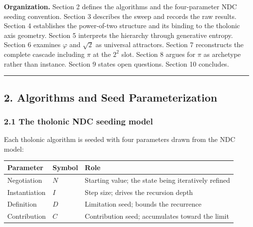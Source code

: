\documentclass[
  11pt,
  letterpaper,
]{article}
\begin{document}
\textbf{Organization.} Section 2 defines the algorithms and the
four-parameter NDC seeding convention. Section 3 describes the sweep and
records the raw results. Section 4 establishes the power-of-two
structure and its binding to the tholonic axis geometry. Section 5
interprets the hierarchy through generative entropy. Section 6 examines
\(\varphi\) and \(\sqrt{2}\) as universal attractors. Section 7
reconstructs the complete cascade including \(\pi\) at the \(2^2\) slot.
Section 8 argues for \(\pi\) as archetype rather than instance. Section
9 states open questions. Section 10 concludes.

\begin{center}\rule{0.5\linewidth}{0.5pt}\end{center}

\subsection{2. Algorithms and Seed
Parameterization}\label{algorithms-and-seed-parameterization}

\subsubsection{2.1 The tholonic NDC seeding
model}\label{the-tholonic-ndc-seeding-model}

Each tholonic algorithm is seeded with four parameters drawn from the
NDC model:

\begin{longtable}[]{@{}
  >{\raggedright\arraybackslash}p{}
  >{\raggedright\arraybackslash}p{}
  >{\raggedright\arraybackslash}p{}@{}}
\toprule\noalign{}
\begin{minipage}[b]{\linewidth}\raggedright
Parameter
\end{minipage} & \begin{minipage}[b]{\linewidth}\raggedright
Symbol
\end{minipage} & \begin{minipage}[b]{\linewidth}\raggedright
Role
\end{minipage} \\
\midrule\noalign{}
\endhead
\bottomrule\noalign{}
\endlastfoot
Negotiation & \(N\) & Starting value; the state being iteratively
refined \\
Instantiation & \(I\) & Step size; drives the recursion depth \\
Definition & \(D\) & Limitation seed; bounds the recurrence \\
Contribution & \(C\) & Contribution seed; accumulates toward the
limit \\
\end{longtable}
\end{document}
